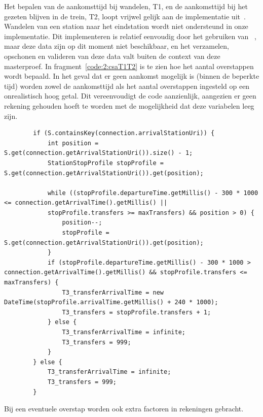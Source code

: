 Het bepalen van de aankomsttijd bij wandelen, T1, en de aankomsttijd bij het gezeten blijven in de trein, T2, loopt vrijwel gelijk aan de implementatie uit~\cite{strasser17}. Wandelen van een station naar het eindstation wordt niet ondersteund in onze implementatie. Dit implementeren is relatief eenvoudig door het gebruiken van ~\citep{strasser17,hannemann08}, maar deze data zijn op dit moment niet beschikbaar, en het verzamelen, opschonen en valideren van deze data valt buiten de context van deze masterproef. In fragment~\ref{code:2:csaT1T2} is te zien hoe het aantal overstappen wordt bepaald. In het geval dat er geen aankomst mogelijk is (binnen de beperkte tijd) worden zowel de aankomsttijd als het aantal overstappen ingesteld op een onrealistisch hoog getal. Dit vereenvoudigt de code aanzienlijk, aangezien er geen rekening gehouden hoeft te worden met de mogelijkheid dat deze variabelen leeg zijn.

\begin{listing}[htb]
	\begin{verbatim}
		if (S.containsKey(connection.arrivalStationUri)) {
			int position = S.get(connection.getArrivalStationUri()).size() - 1;
			StationStopProfile stopProfile = S.get(connection.getArrivalStationUri()).get(position);
			
			while ((stopProfile.departureTime.getMillis() - 300 * 1000 <= connection.getArrivalTime().getMillis() ||
			stopProfile.transfers >= maxTransfers) && position > 0) {
				position--;
				stopProfile = S.get(connection.getArrivalStationUri()).get(position);
			}
			if (stopProfile.departureTime.getMillis() - 300 * 1000 > connection.getArrivalTime().getMillis() && stopProfile.transfers <= maxTransfers) {
				T3_transferArrivalTime = new DateTime(stopProfile.arrivalTime.getMillis() + 240 * 1000);
				T3_transfers = stopProfile.transfers + 1;
			} else {
				T3_transferArrivalTime = infinite;
				T3_transfers = 999;
			}
		} else {
			T3_transferArrivalTime = infinite;
			T3_transfers = 999;
		}
		\end{verbatim}
		\caption[CSA: Bepalen van aankomsttijden]{Bij een eventuele overstap worden ook extra factoren in rekeningen gebracht.}
		\label{code:2:csaT3}
\end{listing}

